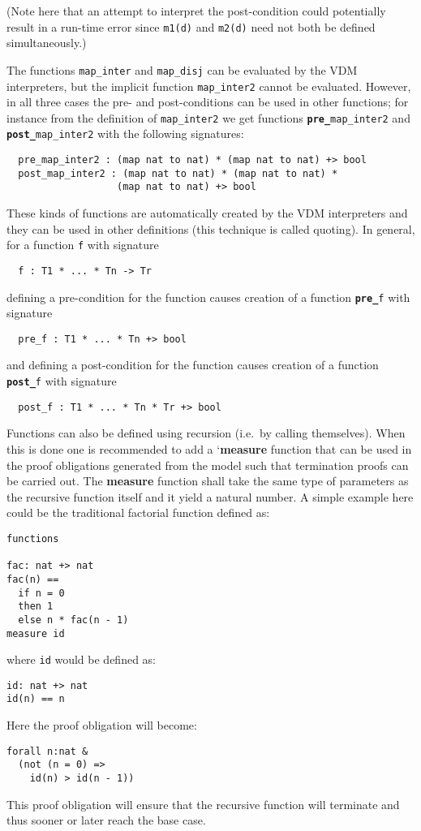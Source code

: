 \documentclass{overturerepchap}
\newcommand{\Lop}[1]{`{\bf\ttfamily #1}\Quote}
\newcommand{\keyw}[1]{{\bf\ttfamily #1}}
\begin{document}
(Note here that an attempt to interpret the post-condition could
potentially result in a run-time error since \texttt{m1(d)} and
\texttt{m2(d)} need not both be defined simultaneously.)

The functions {\tt map\_inter} and {\tt map\_disj} can be evaluated by the
VDM interpreters, but the implicit function {\tt map\_inter2} cannot be evaluated.
However, in all three cases the pre- and post-conditions can be used
in other functions; for instance from the definition of
\texttt{map\_inter2} we get functions \texttt{\keyw{pre\_}map\_inter2}
and \texttt{\keyw{post\_}map\_inter2} with the following signatures:

\begin{lstlisting}
  pre_map_inter2 : (map nat to nat) * (map nat to nat) +> bool
  post_map_inter2 : (map nat to nat) * (map nat to nat) *
                   (map nat to nat) +> bool
\end{lstlisting}
These kinds of functions are automatically created by the VDM
interpreters and they can be used in other definitions (this technique
is called quoting). In general, for a function \texttt{f} with
signature
\begin{lstlisting}
  f : T1 * ... * Tn -> Tr
\end{lstlisting}
defining a pre-condition for the function causes creation of a
function \texttt{\keyw{pre\_}f} with signature
\begin{lstlisting}
  pre_f : T1 * ... * Tn +> bool
\end{lstlisting}
and defining a post-condition for the function causes creation of a
function \texttt{\keyw{post\_}f} with signature
\begin{lstlisting}
  post_f : T1 * ... * Tn * Tr +> bool
\end{lstlisting}

Functions can also be defined using recursion (i.e.\ by calling
themselves). When this is done one is recommended to add
a \Lop{measure} function that can be used in the proof obligations
generated from the model such that termination proofs can be carried
out. The {\bf\ttfamily measure} function shall take the same type of
parameters as the recursive function itself and it yield a natural
number. A simple example here could be the traditional factorial function
defined as:
\begin{lstlisting}
functions

fac: nat +> nat
fac(n) ==
  if n = 0
  then 1
  else n * fac(n - 1)
measure id
\end{lstlisting}
where \texttt{id} would be defined as:
\begin{lstlisting}
id: nat +> nat
id(n) == n
\end{lstlisting}
Here the proof obligation will become:
\begin{lstlisting}
forall n:nat &
  (not (n = 0) =>
    id(n) > id(n - 1))
\end{lstlisting}
\noindent This proof obligation will ensure that the recursive
function will terminate and thus sooner or later reach the base case.
\end{document}
